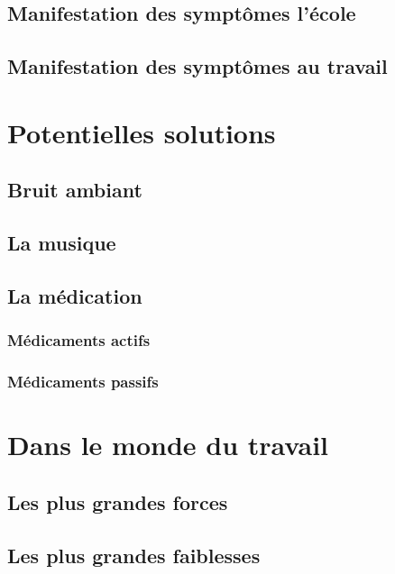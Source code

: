 \documentclass[a4paper, 11pt]{report}
\begin{document}
\subsection{Manifestation des symptômes l'école}

\subsection{Manifestation des symptômes au travail}

\clearpage

\section{Potentielles solutions}

\subsection{Bruit ambiant}

\subsection{La musique}

\subsection{La médication}

\subsubsection{Médicaments actifs}

\subsubsection{Médicaments passifs}

\clearpage

\section{Dans le monde du travail}

\subsection{Les plus grandes forces}

\subsection{Les plus grandes faiblesses}

\end{document}
